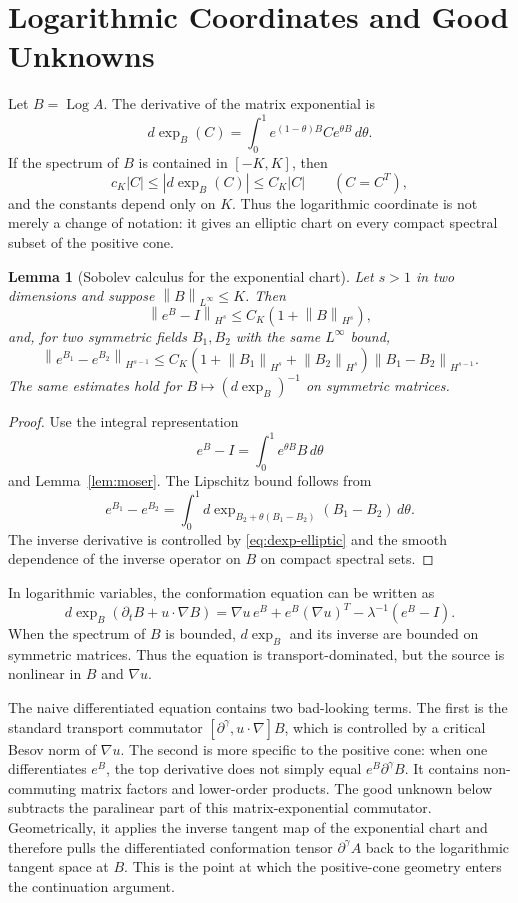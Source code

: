 \documentclass[11pt]{article}
\newtheorem{lemma}{Lemma}[section]
\newcommand{\Id}{I}
\newcommand{\Log}{\operatorname{Log}}
\newcommand{\norm}[1]{\left\lVert #1\right\rVert}
\begin{document}
\section{Logarithmic Coordinates and Good Unknowns}
\label{sec:log}

Let \(B=\Log A\).  The derivative of the matrix exponential is
\[
  d\exp_B(C)=\int_0^1 e^{(1-\theta)B}Ce^{\theta B}\,d\theta .
\]
If the spectrum of \(B\) is contained in \([-K,K]\), then
\[
  c_K|C|\le |d\exp_B(C)|\le C_K|C|
  \qquad (C=C^T),
  \label{eq:dexp-elliptic}
\]
and the constants depend only on \(K\).  Thus the logarithmic coordinate is
not merely a change of notation: it gives an elliptic chart on every compact
spectral subset of the positive cone.

\begin{lemma}[Sobolev calculus for the exponential chart]
\label{lem:exp-calculus}
Let \(s>1\) in two dimensions and suppose
\(\norm{B}_{L^\infty}\le K\).  Then
\[
  \norm{e^B-\Id}_{H^s}
  \le C_K\left(1+\norm{B}_{H^s}\right),
  \label{eq:exp-Hs}
\]
and, for two symmetric fields \(B_1,B_2\) with the same \(L^\infty\) bound,
\[
  \norm{e^{B_1}-e^{B_2}}_{H^{s-1}}
  \le
  C_K\left(1+\norm{B_1}_{H^s}+\norm{B_2}_{H^s}\right)
  \norm{B_1-B_2}_{H^{s-1}} .
  \label{eq:exp-lip}
\]
The same estimates hold for \(B\mapsto(d\exp_B)^{-1}\) on symmetric matrices.
\end{lemma}

\begin{proof}
Use the integral representation
\[
  e^B-\Id=\int_0^1 e^{\theta B}B\,d\theta
\]
and Lemma~\ref{lem:moser}.  The Lipschitz bound follows from
\[
  e^{B_1}-e^{B_2}
  =
  \int_0^1
  d\exp_{B_2+\theta(B_1-B_2)}(B_1-B_2)\,d\theta .
\]
The inverse derivative is controlled by \eqref{eq:dexp-elliptic} and the
smooth dependence of the inverse operator on \(B\) on compact spectral sets.
\end{proof}

In logarithmic variables, the conformation equation can be written as
\[
  d\exp_B\left(\partial_tB+u\cdot\nabla B\right)
  =
  \nabla u\,e^B+e^B(\nabla u)^T-\lambda^{-1}(e^B-\Id).
  \label{eq:log-equation}
\]
When the spectrum of \(B\) is bounded, \(d\exp_B\) and its inverse are bounded
on symmetric matrices.  Thus the equation is transport-dominated, but the
source is nonlinear in \(B\) and \(\nabla u\).

The naive differentiated equation contains two bad-looking terms.  The first
is the standard transport commutator
\([\partial^\gamma,u\cdot\nabla]B\), which is controlled by a critical Besov
norm of \(\nabla u\).  The second is more specific to the positive cone: when
one differentiates \(e^B\), the top derivative does not simply equal
\(e^B\partial^\gamma B\).  It contains non-commuting matrix factors and
lower-order products.  The good unknown below subtracts the paralinear part of
this matrix-exponential commutator.  Geometrically, it applies the inverse
tangent map of the exponential chart and therefore pulls the differentiated
conformation tensor \(\partial^\gamma A\) back to the logarithmic tangent
space at \(B\).  This is the point at which the positive-cone geometry enters
the continuation argument.
\end{document}
